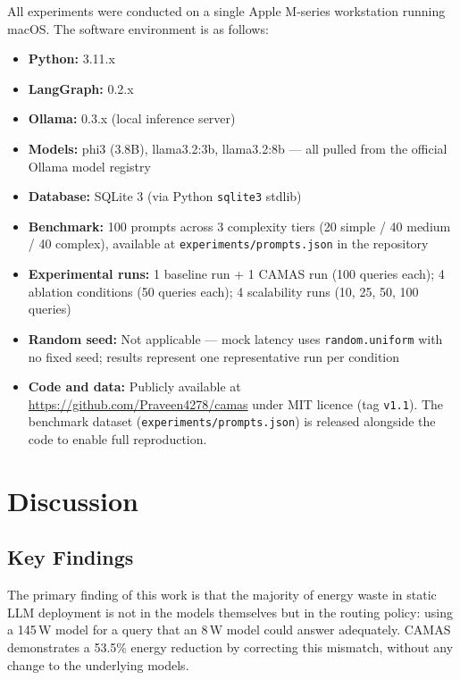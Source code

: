 \documentclass[journal]{IEEEtran}
\begin{document}
All experiments were conducted on a single Apple M-series workstation running
macOS. The software environment is as follows:

\begin{itemize}
    \item \textbf{Python:} 3.11.x
    \item \textbf{LangGraph:} 0.2.x
    \item \textbf{Ollama:} 0.3.x (local inference server)
    \item \textbf{Models:} phi3 (3.8B), llama3.2:3b, llama3.2:8b — all
          pulled from the official Ollama model registry
    \item \textbf{Database:} SQLite 3 (via Python \texttt{sqlite3} stdlib)
    \item \textbf{Benchmark:} 100 prompts across 3 complexity tiers
          (20 simple / 40 medium / 40 complex), available at
          \texttt{experiments/prompts.json} in the repository
    \item \textbf{Experimental runs:} 1 baseline run + 1 CAMAS run
          (100 queries each); 4 ablation conditions (50 queries each);
          4 scalability runs (10, 25, 50, 100 queries)
    \item \textbf{Random seed:} Not applicable — mock latency uses
          \texttt{random.uniform} with no fixed seed; results represent
          one representative run per condition
    \item \textbf{Code and data:} Publicly available at
          \url{https://github.com/Praveen4278/camas} under MIT licence
          (tag \texttt{v1.1}). The benchmark dataset
          (\texttt{experiments/prompts.json}) is released alongside the
          code to enable full reproduction.
\end{itemize}

\section{Discussion}

\subsection{Key Findings}

The primary finding of this work is that the majority of energy waste in static
LLM deployment is not in the models themselves but in the routing policy: using
a 145\,W model for a query that an 8\,W model could answer adequately. CAMAS
demonstrates a 53.5\% energy reduction by correcting this mismatch, without
any change to the underlying models.
\end{document}
